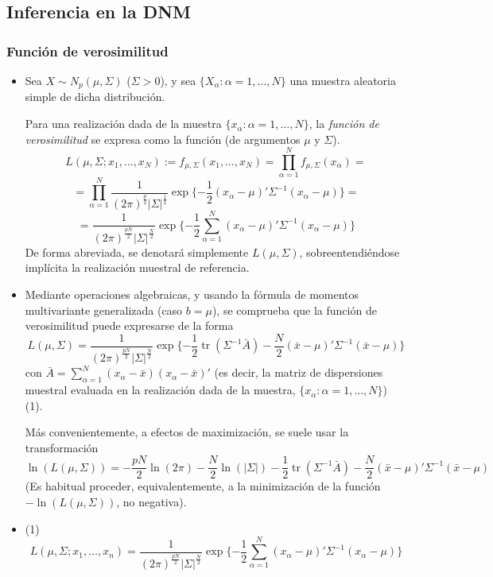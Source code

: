 \documentclass[11pt,a4paper]{article}
\begin{document}
\subsection{Inferencia en la DNM}
\subsubsection{Función de verosimilitud}
\begin{itemize}
\item Sea $X \sim N_{p}(\mu,\Sigma)$ ($\Sigma>0$), y sea $\{X_{\alpha}: \alpha=1,\dots,N\}$ una muestra aleatoria simple de dicha distribución.

Para una realización dada de la muestra $\{x_{\alpha}: \alpha=1,\dots,N\}$, la \emph{función de verosimilitud} se expresa como la función (de argumentos $\mu$ y $\Sigma$).
$$L(\mu,\Sigma;x_{1},\dots,x_{N}) := f_{\mu,\Sigma}(x_{1},\dots,x_{N}) = \prod_{\alpha=1}^{N}f_{\mu,\Sigma}(x_{\alpha}) =$$
$$= \prod_{\alpha=1}^{N} \frac{1}{(2\pi)^{\frac{p}{2}}|\Sigma|^{\frac{1}{2}}} \operatorname{exp}\{-\frac{1}{2}(x_{\alpha}-\mu)'\Sigma^{-1}(x_{\alpha}-\mu)\} =$$
$$= \frac{1}{(2\pi)^{\frac{pN}{2}}|\Sigma|^{\frac{N}{2}}} \operatorname{exp}\{-\frac{1}{2}\sum_{\alpha=1}^{N}(x_{\alpha}-\mu)'\Sigma^{-1}(x_{\alpha}-\mu)\}$$
De forma abreviada, se denotará simplemente $L(\mu, \Sigma)$, sobreentendiéndose implícita la realización muestral de referencia.

\item Mediante operaciones algebraicas, y usando la fórmula de momentos multivariante generalizada (caso $b=\mu$), se comprueba que la función de verosimilitud puede expresarse de la forma
$$L(\mu,\Sigma) = \frac{1}{(2\pi)^{\frac{pN}{2}}|\Sigma|^{\frac{N}{2}}} \operatorname{exp}\{-\frac{1}{2} \operatorname{tr}(\Sigma^{-1}\bar{A}) - \frac{N}{2} (\bar{x}-\mu)'\Sigma^{-1}(\bar{x}-\mu)\}$$
con $\bar{A} = \sum_{\alpha=1}^{N}(x_{\alpha}-\bar{x})(x_{\alpha}-\bar{x})'$ (es decir, la matriz de dispersiones muestral evaluada en la realización dada de la muestra, $\{x_{\alpha}: \alpha=1, \dots, N\}$) (1).

Más convenientemente, a efectos de maximización, se suele usar la transformación
$$\ln(L(\mu,\Sigma)) = -\frac{pN}{2}\ln(2\pi) -\frac{N}{2}\ln(|\Sigma|) -\frac{1}{2}\operatorname{tr}(\Sigma^{-1}\bar{A}) -\frac{N}{2}(\bar{x}-\mu)'\Sigma^{-1}(\bar{x}-\mu)$$
(Es habitual proceder, equivalentemente, a la minimización de la función $-\ln(L(\mu,\Sigma))$, no negativa).

\item (1) $$L(\mu, \Sigma; x_{1}, \dots, x_{n}) = \frac{1}{(2\pi)^{\frac{pN}{2}}|\Sigma|^{\frac{N}{2}}} \operatorname{exp}\{-\frac{1}{2} \sum_{\alpha=1}^{N}(x_{\alpha}-\mu)'\Sigma^{-1}(x_{\alpha}-\mu)\}$$


\end{itemize}
\end{document}
